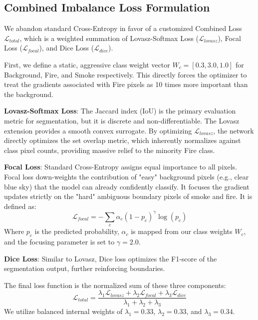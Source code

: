 \documentclass[conference]{IEEEtran}
\begin{document}
\subsection{Combined Imbalance Loss Formulation}
We abandon standard Cross-Entropy in favor of a customized Combined Loss $\mathcal{L}_{total}$, which is a weighted summation of Lovasz-Softmax Loss ($\mathcal{L}_{lovasz}$), Focal Loss ($\mathcal{L}_{focal}$), and Dice Loss ($\mathcal{L}_{dice}$). 

First, we define a static, aggressive class weight vector $W_c = [0.3, 3.0, 1.0]$ for Background, Fire, and Smoke respectively. This directly forces the optimizer to treat the gradients associated with Fire pixels as 10 times more important than the background.

\textbf{Lovasz-Softmax Loss}: The Jaccard index (IoU) is the primary evaluation metric for segmentation, but it is discrete and non-differentiable. The Lovasz extension provides a smooth convex surrogate. By optimizing $\mathcal{L}_{lovasz}$, the network directly optimizes the set overlap metric, which inherently normalizes against class pixel counts, providing massive relief to the minority Fire class.

\textbf{Focal Loss}: Standard Cross-Entropy assigns equal importance to all pixels. Focal loss down-weights the contribution of "easy" background pixels (e.g., clear blue sky) that the model can already confidently classify. It focuses the gradient updates strictly on the "hard" ambiguous boundary pixels of smoke and fire. It is defined as:
\begin{equation}
    \mathcal{L}_{focal} = - \sum_{c} \alpha_c (1 - p_c)^\gamma \log(p_c)
\end{equation}
Where $p_c$ is the predicted probability, $\alpha_c$ is mapped from our class weights $W_c$, and the focusing parameter is set to $\gamma = 2.0$.

\textbf{Dice Loss}: Similar to Lovasz, Dice loss optimizes the F1-score of the segmentation output, further reinforcing boundaries. 

The final loss function is the normalized sum of these three components:
\begin{equation}
    \mathcal{L}_{total} = \frac{\lambda_1 \mathcal{L}_{lovasz} + \lambda_2 \mathcal{L}_{focal} + \lambda_3 \mathcal{L}_{dice}}{\lambda_1 + \lambda_2 + \lambda_3}
\end{equation}
We utilize balanced internal weights of $\lambda_1 = 0.33$, $\lambda_2 = 0.33$, and $\lambda_3 = 0.34$. 
\end{document}
